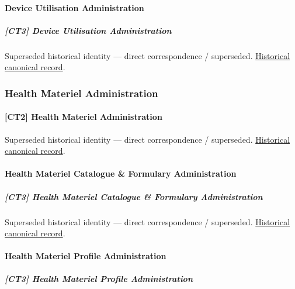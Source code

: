 \paragraph{Device Utilisation Administration}

\subparagraph{[CT3] Device Utilisation Administration}

\par\label{element:a0af0a86667d48f4ab95ed2920e878cb}
Superseded historical identity — direct correspondence / superseded. \href{../../../../continuum/strategy/capability/a0af0a86667d48f4ab95ed2920e878cb.md}{Historical canonical record}.\par

\subsubsection{Health Materiel Administration}

\paragraph{[CT2] Health Materiel Administration}

\par\label{element:4952f86078c54a8d898ac992e6f4f577}
Superseded historical identity — direct correspondence / superseded. \href{../../../../continuum/strategy/capability/4952f86078c54a8d898ac992e6f4f577.md}{Historical canonical record}.\par

\paragraph{Health Materiel Catalogue \& Formulary Administration}

\subparagraph{[CT3] Health Materiel Catalogue \& Formulary Administration}

\par\label{element:5c691959e2cc4a289fc25b9f3497eed9}
Superseded historical identity — direct correspondence / superseded. \href{../../../../continuum/strategy/capability/5c691959e2cc4a289fc25b9f3497eed9.md}{Historical canonical record}.\par

\paragraph{Health Materiel Profile Administration}

\subparagraph{[CT3] Health Materiel Profile Administration}

